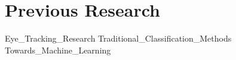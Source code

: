\chapter{Previous Research} \label{ch:pr}


{Eye_Tracking_Research}
{Traditional_Classification_Methods}
{Towards_Machine_Learning}